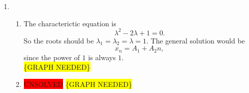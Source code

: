 \documentclass[
    classnum=MATH564,
    classname=MATHEMATICAL\ MODELING,
    due=January\ 28\,\ 2020,
    author=Gabrielle\ Streeter\qquad Hannah\ Wu\qquad\ Minghang\ Li,
    authorshort=Streeter\ \&\ Wu\ \&\ Li,
    teacher= Zachary\ M.\ Boyd,
    hw=1
]{hw-template}
\newcommand{\requiregraph}{\colorbox{yellow}{\{GRAPH NEEDED\}}}
\begin{document}
\begin{homeworkProblem}
\begin{enumerate}
    \pagebreak
    \item \begin{enumerate}[label=(\roman*)]
    \addtocounter{enumii}{1}
        \item The characterictic equation is \[
            \lambda^2 - 2\lambda + 1 = 0.
        \]
        So the roots should be $\lambda_1 = \lambda_2 = \lambda = 1$.
        The general solution would be \[
            x_n = A_1 + A_2 n,
        \] since the power of $1$ is always $1$.\\
        \requiregraph

        \item \colorbox{red}{UNSOLVED}
        \requiregraph
    \end{enumerate}
\end{enumerate}
\end{homeworkProblem}

\pagebreak
\end{document}
